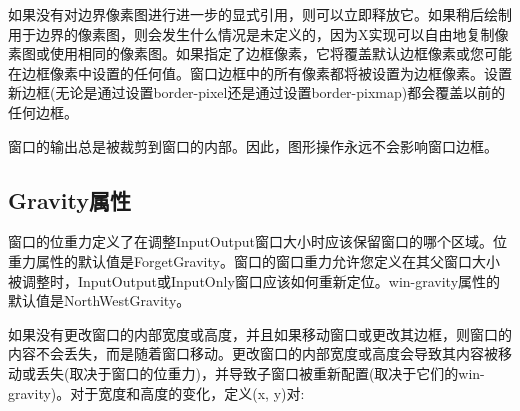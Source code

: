 如果没有对边界像素图进行进一步的显式引用，则可以立即释放它。如果稍后绘制用于边界的像素图，则会发生什么情况是未定义的，因为X实现可以自由地复制像素图或使用相同的像素图。如果指定了边框像素，它将覆盖默认边框像素或您可能在边框像素中设置的任何值。窗口边框中的所有像素都将被设置为边框像素。设置新边框(无论是通过设置border-pixel还是通过设置border-pixmap)都会覆盖以前的任何边框。

窗口的输出总是被裁剪到窗口的内部。因此，图形操作永远不会影响窗口边框。

\subsection{Gravity属性}

窗口的位重力定义了在调整InputOutput窗口大小时应该保留窗口的哪个区域。位重力属性的默认值是ForgetGravity。窗口的窗口重力允许您定义在其父窗口大小被调整时，InputOutput或InputOnly窗口应该如何重新定位。win-gravity属性的默认值是NorthWestGravity。

如果没有更改窗口的内部宽度或高度，并且如果移动窗口或更改其边框，则窗口的内容不会丢失，而是随着窗口移动。更改窗口的内部宽度或高度会导致其内容被移动或丢失(取决于窗口的位重力)，并导致子窗口被重新配置(取决于它们的win-gravity)。对于宽度和高度的变化，定义(x, y)对:
